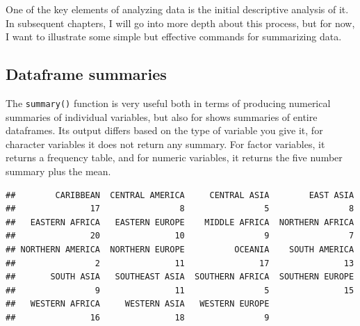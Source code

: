 \documentclass[
]{book}
\newenvironment{Shaded}{\begin{snugshade}}{\end{snugshade}}
\newcommand{\FunctionTok}[1]{\textcolor[rgb]{0.00,0.00,0.00}{#1}}
\newcommand{\NormalTok}[1]{#1}
\newcommand{\SpecialCharTok}[1]{\textcolor[rgb]{0.00,0.00,0.00}{#1}}
\begin{document}
One of the key elements of analyzing data is the initial descriptive
analysis of it. In subsequent chapters, I will go into more depth about
this process, but for now, I want to illustrate some simple but
effective commands for summarizing data.

\hypertarget{dataframe-summaries}{%
\subsection{Dataframe summaries}\label{dataframe-summaries}}

The \texttt{summary()} function is very useful both in terms of producing
numerical summaries of individual variables, but also for shows
summaries of entire dataframes. Its output differs based on the type of
variable you give it, for character variables it does not return any
summary. For factor variables, it returns a frequency table, and for
numeric variables, it returns the five number summary plus the mean.

\begin{Shaded}
\end{Shaded}

\begin{verbatim}
##        CARIBBEAN  CENTRAL AMERICA     CENTRAL ASIA        EAST ASIA 
##               17                8                5                8 
##   EASTERN AFRICA   EASTERN EUROPE    MIDDLE AFRICA  NORTHERN AFRICA 
##               20               10                9                7 
## NORTHERN AMERICA  NORTHERN EUROPE          OCEANIA    SOUTH AMERICA 
##                2               11               17               13 
##       SOUTH ASIA   SOUTHEAST ASIA  SOUTHERN AFRICA  SOUTHERN EUROPE 
##                9               11                5               15 
##   WESTERN AFRICA     WESTERN ASIA   WESTERN EUROPE 
##               16               18                9
\end{verbatim}

\begin{Shaded}
\end{Shaded}
\end{document}

